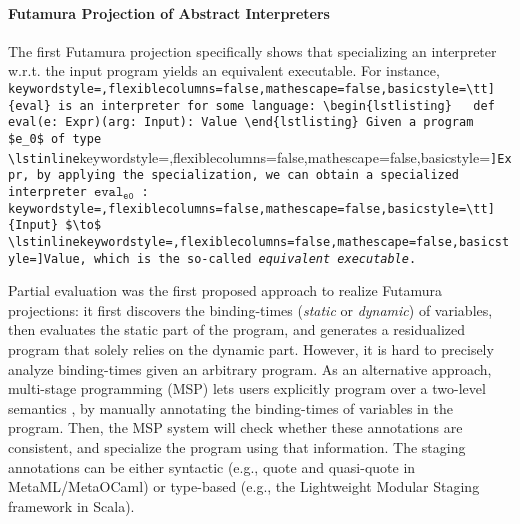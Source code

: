 
\paragraph{Futamura Projection of Abstract Interpreters}

The first Futamura projection specifically shows that specializing an
interpreter w.r.t. the input program yields an equivalent
executable. For instance,
\lstinline[keywordstyle=,flexiblecolumns=false,mathescape=false,basicstyle=\tt]{eval}
is an interpreter for some language:
\begin{lstlisting}
  def eval(e: Expr)(arg: Input): Value
\end{lstlisting}
Given a program $e_0$ of type
\lstinline[keywordstyle=,flexiblecolumns=false,mathescape=false,basicstyle=\tt]{Expr},
by applying the specialization, we can obtain a specialized
interpreter $\texttt{eval}_{\texttt{e0}}$ :
\lstinline[keywordstyle=,flexiblecolumns=false,mathescape=false,basicstyle=\tt]{Input}
$\to$
\lstinline[keywordstyle=,flexiblecolumns=false,mathescape=false,basicstyle=\tt]{Value},
which is the so-called \textit{equivalent executable}.


Partial evaluation \cite{DBLP:books/daglib/0072559} was the first proposed
approach to realize Futamura projections: it first discovers the binding-times
(\textit{static} or \textit{dynamic}) of variables, then evaluates the static
part of the program, and generates a residualized program that solely relies on
the dynamic part. However, it is hard to precisely analyze binding-times given
an arbitrary program. As an alternative approach, multi-stage programming (MSP)
\cite{taha1999multi, DBLP:conf/pepm/TahaS97} lets users explicitly program over
a two-level semantics \cite{NIELSON198859}, by manually annotating the
binding-times of variables in the program. Then, the MSP system will check
whether these annotations are consistent, and specialize the program using that
information. The staging annotations can be either syntactic (e.g., quote and
quasi-quote in MetaML/MetaOCaml) or type-based (e.g., the Lightweight Modular
Staging framework \cite{DBLP:conf/gpce/RompfO10} in Scala).

